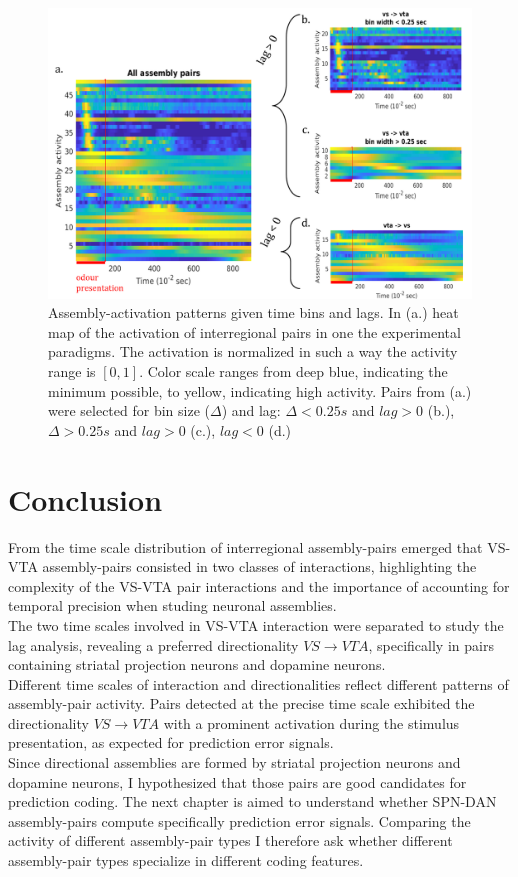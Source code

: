 \begin{figure}[H]
    \centering
    \includegraphics[scale=0.56]{figures/AsActPerBinLag1.png}
    \caption{Assembly-activation patterns given time bins and lags. In (a.) heat map of the activation of interregional pairs in one the experimental paradigms. The activation is normalized in such a way the activity range is $[0,1]$. Color scale ranges from deep blue, indicating the minimum possible, to yellow, indicating high activity. Pairs from (a.) were selected for bin size ($\Delta$) and lag: $\Delta < 0.25 s$ and $lag > 0$ (b.), $\Delta > 0.25 s$ and $lag > 0$ (c.), $lag < 0$ (d.)}
    \label{fig:AsActBinLag}
\end{figure}
\section{Conclusion}
From the time scale distribution of interregional assembly-pairs emerged that VS-VTA assembly-pairs consisted in two classes of interactions, highlighting the complexity of the VS-VTA pair interactions and the importance of accounting for temporal precision when studing neuronal assemblies.\\The two time scales involved in VS-VTA interaction were separated to study the lag analysis, revealing a preferred directionality $VS\rightarrow VTA$, specifically in pairs containing striatal projection neurons and dopamine neurons.\\Different time scales of interaction and directionalities reflect different patterns of assembly-pair activity. Pairs detected at the precise time scale exhibited the directionality $VS\rightarrow VTA$ with a prominent activation during the stimulus presentation, as expected for prediction error signals.\\Since directional assemblies are formed by striatal projection neurons and dopamine neurons, I hypothesized that those pairs are good candidates for prediction coding. The next chapter is aimed to understand whether SPN-DAN assembly-pairs compute specifically prediction error signals. Comparing the activity of different assembly-pair types I therefore ask whether different assembly-pair types specialize in different coding features.
